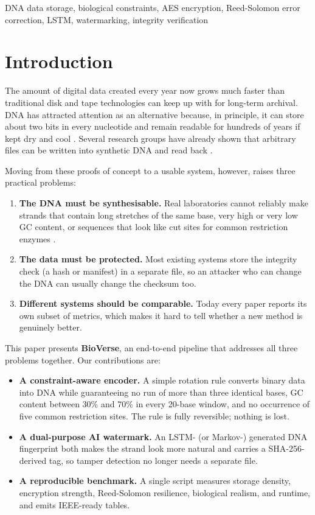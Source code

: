 \documentclass[conference]{IEEEtran}
\begin{document}
\begin{IEEEkeywords}
DNA data storage, biological constraints, AES encryption, Reed-Solomon error correction, LSTM, watermarking, integrity verification
\end{IEEEkeywords}

\section{Introduction}

The amount of digital data created every year now grows much faster than traditional disk and tape technologies can keep up with for long-term archival. DNA has attracted attention as an alternative because, in principle, it can store about two bits in every nucleotide and remain readable for hundreds of years if kept dry and cool \cite{b1}. Several research groups have already shown that arbitrary files can be written into synthetic DNA and read back \cite{b2,b3,b4}.

Moving from these proofs of concept to a usable system, however, raises three practical problems:

\begin{enumerate}
\item \textbf{The DNA must be synthesisable.} Real laboratories cannot reliably make strands that contain long stretches of the same base, very high or very low GC content, or sequences that look like cut sites for common restriction enzymes \cite{b5}.
\item \textbf{The data must be protected.} Most existing systems store the integrity check (a hash or manifest) in a separate file, so an attacker who can change the DNA can usually change the checksum too.
\item \textbf{Different systems should be comparable.} Today every paper reports its own subset of metrics, which makes it hard to tell whether a new method is genuinely better.
\end{enumerate}

This paper presents \textbf{BioVerse}, an end-to-end pipeline that addresses all three problems together. Our contributions are:

\begin{itemize}
\item \textbf{A constraint-aware encoder.} A simple rotation rule converts binary data into DNA while guaranteeing no run of more than three identical bases, GC content between 30\% and 70\% in every 20-base window, and no occurrence of five common restriction sites. The rule is fully reversible; nothing is lost.
\item \textbf{A dual-purpose AI watermark.} An LSTM- (or Markov-) generated DNA fingerprint both makes the strand look more natural and carries a SHA-256-derived tag, so tamper detection no longer needs a separate file.
\item \textbf{A reproducible benchmark.} A single script measures storage density, encryption strength, Reed-Solomon resilience, biological realism, and runtime, and emits IEEE-ready tables.
\end{itemize}
\end{document}
